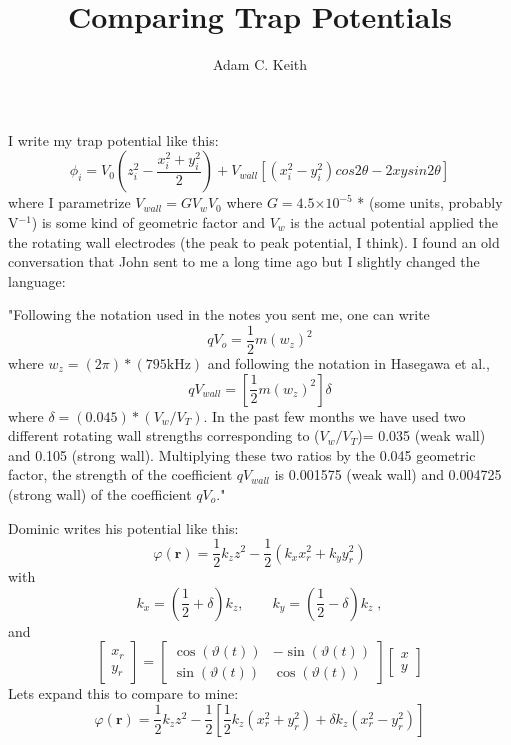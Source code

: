 \documentclass[12pt]{article}
\providecommand{\e}[1]{\ensuremath{\times 10^{#1}}}
\begin{document}
\title{Comparing Trap Potentials}
\author{Adam C. Keith}
\maketitle

I write my trap potential like this:
\begin{equation}
\phi_i = V_0 \left( z_i^2 - \frac{x_i^2 + y_i^2}{2} \right) +  V_{wall}[(x_i^2 - y_i^2) cos2\theta - 2x y sin2\theta] 
\end{equation}
where I parametrize $V_{wall} = GV_wV_0$ where $G= 4.5 \e{-5}$ * (some units, probably V$^{-1}$) is some kind of geometric factor and $V_w$ is the actual 
potential applied the the rotating wall electrodes (the peak to peak potential, I think). I found an old conversation that John sent to me a long time ago
but I slightly changed the language:

"Following the notation used in the notes you sent me, one can write
\begin{equation}
qV_{o} = \frac{1}{2}m(w_z)^2 
\end{equation}
where $w_z=(2\pi)*(795 \text{kHz})$ and  following the notation in Hasegawa et al.,
\begin{equation}
qV_{wall} = [\frac{1}{2}m(w_z)^2]\delta
\end{equation}
where $\delta=(0.045)*(V_w/V_T)$.
In the past few months we have used two different rotating wall strengths corresponding to ($V_w/V_T$)= 0.035 (weak wall) and 0.105 (strong wall).
Multiplying these two ratios by the 0.045 geometric factor, the strength of the coefficient $qV_{wall}$ is 0.001575 (weak wall) and 0.004725 (strong wall) of the coefficient $qV_{o}$."


Dominic writes his potential like this:
\begin{equation}
\varphi(\mathbf{r}) = \frac{1}{2}k_z z^2 - 
\frac{1}{2} \left(k_x x_r^2 + k_y y_r^2\right)
\end{equation}
with
\begin{equation}
k_x=\left(\frac{1}{2}+\delta\right)k_z,\qquad 
k_y=\left(\frac{1}{2}-\delta\right)k_z\;,
\end{equation}
and
\begin{equation}
\left[
\begin{array}{c}
x_r\\
y_r
\end{array}\right] =
\left[
\begin{array}{cc}
\cos(\vartheta(t)) & -\sin(\vartheta(t))\\
\sin(\vartheta(t)) & \cos(\vartheta(t))
\end{array}\right]
\left[\begin{array}{c}
x\\
y
\end{array}\right]
\end{equation}
Lets expand this to compare to mine:
\begin{equation}
\varphi(\mathbf{r}) = \frac{1}{2}k_z z^2 - 
\frac{1}{2} \left[\frac{1}{2}k_z(x_r^2 + y_r^2) + \delta k_z (x_r^2 - y_r^2) \right]
\end{equation}
\end{document}
